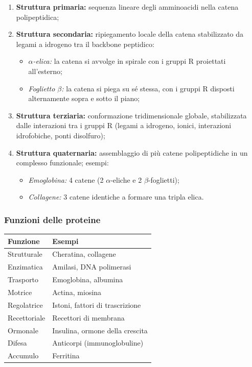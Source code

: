 \documentclass[11pt,a4paper,openright,twoside]{book}
\theoremstyle{definition}
\theoremstyle{plain}
\theoremstyle{remark}
\begin{document}
\begin{enumerate}
  \item \textbf{Struttura primaria:} sequenza lineare degli amminoacidi nella catena polipeptidica;
  \item \textbf{Struttura secondaria:} ripiegamento locale della catena stabilizzato da legami a idrogeno tra il backbone peptidico:
    \begin{itemize}
      \item \textit{$\alpha$-elica:} la catena si avvolge in spirale con i gruppi R proiettati all'esterno;
      \item \textit{Foglietto $\beta$:} la catena si piega su sé stessa, con i gruppi R disposti alternamente sopra e sotto il piano;
    \end{itemize}
  \item \textbf{Struttura terziaria:} conformazione tridimensionale globale, stabilizzata dalle interazioni tra i gruppi R (legami a idrogeno, ionici, interazioni idrofobiche, ponti disolfuro);
  \item \textbf{Struttura quaternaria:} assemblaggio di più catene polipeptidiche in un complesso funzionale; esempi:
    \begin{itemize}
      \item \textit{Emoglobina:} 4 catene (2 $\alpha$-eliche e 2 $\beta$-foglietti);
      \item \textit{Collagene:} 3 catene identiche a formare una tripla elica.
    \end{itemize}
\end{enumerate}

\subsubsection{Funzioni delle proteine}

\begin{center}
\begin{tabular}{ll}
\toprule
\textbf{Funzione} & \textbf{Esempi} \\
\midrule
Strutturale & Cheratina, collagene \\
Enzimatica & Amilasi, DNA polimerasi \\
Trasporto & Emoglobina, albumina \\
Motrice & Actina, miosina \\
Regolatrice & Istoni, fattori di trascrizione \\
Recettoriale & Recettori di membrana \\
Ormonale & Insulina, ormone della crescita \\
Difesa & Anticorpi (immunoglobuline) \\
Accumulo & Ferritina \\
\bottomrule
\end{tabular}
\end{center}
\end{document}
